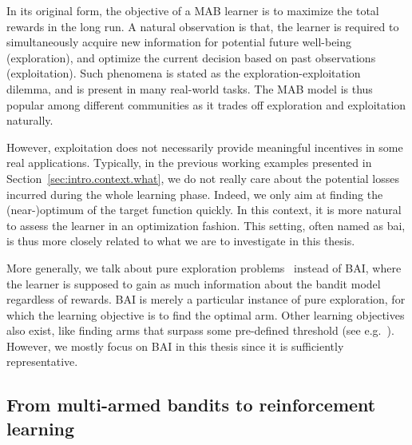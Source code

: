 In its original form, the objective of a MAB learner is to maximize the total rewards in the long run. A natural observation is that, the learner is required to simultaneously acquire new information for potential future well-being (exploration), and optimize the current decision based on past observations (exploitation). Such phenomena is stated as the \gls{exploration-exploitation dilemma}, and is present in many real-world tasks. The MAB model is thus popular among different communities as it trades off exploration and exploitation naturally.

However, exploitation does not necessarily provide meaningful incentives in some real applications. Typically, in the previous working examples presented in Section~\ref{sec:intro.context.what}, we do not really care about the potential losses incurred during the whole learning phase. Indeed, we only aim at finding the (near-)optimum of the target function quickly. In this context, it is more natural to assess the learner in an optimization fashion. This setting, often named as \gls{bai}, is thus more closely related to what we are to investigate in this thesis.

\begin{remark}
\begin{leftbar}[remarkbar]\label{remark:intro.pure}
More generally, we talk about \gls{pure exploration} problems~\citep{bubeck2011pure} instead of BAI, where the learner is supposed to gain as much information about the bandit model regardless of rewards. BAI is merely a particular instance of pure exploration, for which the learning objective is to find the optimal arm. Other learning objectives also exist, like finding arms that surpass some pre-defined threshold (see e.g.~\citealt{locatelli2016thresholding}). However, we mostly focus on BAI in this thesis since it is sufficiently representative.
\end{leftbar}
\end{remark}

\subsection{From multi-armed bandits to reinforcement learning}\label{sec:intro.context.rl}

